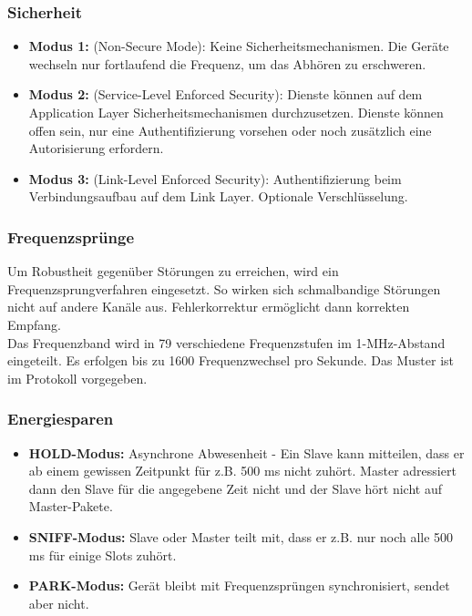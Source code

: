 \documentclass{article} %
\begin{document}
\subsubsection{Sicherheit}	
	\begin{itemize}
	\item \textbf{Modus 1:} (Non-Secure Mode): Keine Sicherheitsmechanismen. Die Geräte wechseln nur fortlaufend die Frequenz, um das Abhören zu erschweren. 
	\item \textbf{Modus 2:} (Service-Level Enforced Security): Dienste können auf dem Application Layer Sicherheitsmechanismen durchzusetzen. Dienste können offen sein, nur eine Authentifizierung vorsehen oder noch zusätzlich eine Autorisierung erfordern. 
	\item \textbf{Modus 3:} (Link-Level Enforced Security): Authentifizierung  beim Verbindungsaufbau auf dem Link Layer. Optionale Verschlüsselung. 
	\end{itemize}
	
\subsubsection{Frequenzsprünge}	
Um Robustheit gegenüber Störungen zu erreichen, wird ein Frequenzsprungverfahren eingesetzt. So wirken sich schmalbandige Störungen nicht auf andere Kanäle aus. Fehlerkorrektur ermöglicht dann korrekten Empfang.\\
Das Frequenzband wird in 79 verschiedene Frequenzstufen im 1-MHz-Abstand eingeteilt. Es erfolgen bis zu 1600 Frequenzwechsel pro Sekunde. Das Muster ist im Protokoll vorgegeben.

\subsubsection{Energiesparen}
	\begin{itemize}
	\item \textbf{HOLD-Modus:} Asynchrone Abwesenheit - Ein Slave kann mitteilen, dass er ab einem gewissen Zeitpunkt für z.B. 500 ms nicht zuhört. Master adressiert dann den Slave für die angegebene Zeit nicht und der Slave hört nicht auf Master-Pakete. 
	\item \textbf{SNIFF-Modus:} Slave oder Master teilt mit, dass er z.B. nur noch alle 500 ms für einige Slots zuhört. 
	\item \textbf{PARK-Modus:} Gerät bleibt mit Frequenzsprüngen synchronisiert, sendet aber nicht. 
	\end{itemize}
\end{document}
